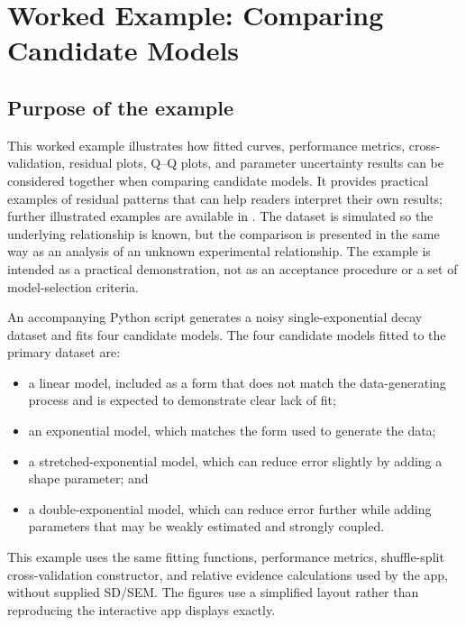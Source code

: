 %

\section{Worked Example: Comparing Candidate Models}
\label{app:model-comparison-tutorial}

\subsection{Purpose of the example}

This worked example illustrates how fitted curves, performance metrics, cross-validation, residual plots, Q--Q plots, and parameter uncertainty results can be considered together when comparing candidate models. It provides practical examples of residual patterns that can help readers interpret their own results; further illustrated examples are available in \cite{motulsky1987, kutner2005, nistResidualAnalysis, psuResidualExamples, originlabResidualPlotAnalysis}. The dataset is simulated so the underlying relationship is known, but the comparison is presented in the same way as an analysis of an unknown experimental relationship. The example is intended as a practical demonstration, not as an acceptance procedure or a set of model-selection criteria.

An accompanying Python script generates a noisy single-exponential decay dataset and fits four candidate models. The four candidate models fitted to the primary dataset are:

\begin{itemize}
    \item a linear model, included as a form that does not match the data-generating process and is expected to demonstrate clear lack of fit;
    \item an exponential model, which matches the form used to generate the data;
    \item a stretched-exponential model, which can reduce error slightly by adding a shape parameter; and
    \item a double-exponential model, which can reduce error further while adding parameters that may be weakly estimated and strongly coupled.
\end{itemize}

This example uses the same fitting functions, performance metrics, shuffle-split cross-validation constructor, and relative evidence calculations used by the app, without supplied SD/SEM. The figures use a simplified layout rather than reproducing the interactive app displays exactly.

